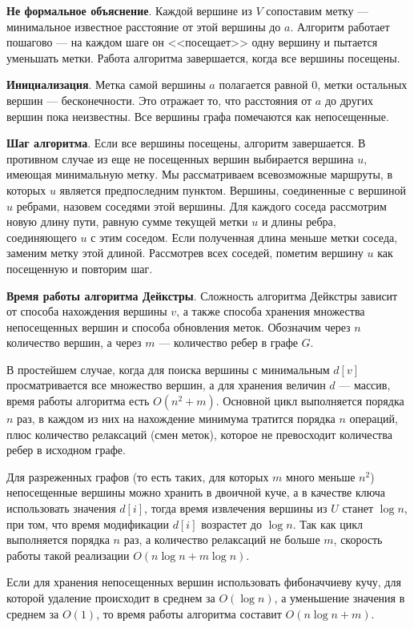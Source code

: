 \textbf{Не формальное объяснение}.
Каждой вершине из $V$ сопоставим метку --- минимальное известное расстояние от этой вершины до $a$. 
Алгоритм работает пошагово --- на каждом шаге он <<посещает>> одну вершину и пытается уменьшать метки. 
Работа алгоритма завершается, когда все вершины посещены.

\textbf{Инициализация}. 
Метка самой вершины $a$ полагается равной $0$, метки остальных вершин --- бесконечности. 
Это отражает то, что расстояния от $a$ до других вершин пока неизвестны. 
Все вершины графа помечаются как непосещенные.

\textbf{Шаг алгоритма}. 
Если все вершины посещены, алгоритм завершается. 
В противном случае из еще не посещенных вершин выбирается вершина $u$, имеющая минимальную метку. 
Мы рассматриваем всевозможные маршруты, в которых $u$ является предпоследним пунктом. 
Вершины, соединенные с вершиной $u$ ребрами, назовем соседями этой вершины. 
Для каждого соседа рассмотрим новую длину пути, равную сумме текущей метки $u$ и длины ребра, соединяющего $u$ с этим соседом. 
Если полученная длина меньше метки соседа, заменим метку этой длиной. 
Рассмотрев всех соседей, пометим вершину $u$ как посещенную и повторим шаг.

\textbf{Время работы алгоритма Дейкстры}.
Сложность алгоритма Дейкстры зависит от способа нахождения вершины $v$, а также способа хранения множества непосещенных вершин и способа обновления меток. 
Обозначим через $n$ количество вершин, а через $m$ --- количество ребер в графе $G$.

В простейшем случае, когда для поиска вершины с минимальным $d[v]$ просматривается все множество вершин, а для хранения величин $d$ --- массив, время работы алгоритма есть $O(n^2 + m)$. 
Основной цикл выполняется порядка $n$ раз, в каждом из них на нахождение минимума тратится порядка $n$ операций, плюс количество релаксаций (смен меток), которое не превосходит количества ребер в исходном графе.

Для разреженных графов (то есть таких, для которых $m$ много меньше $n^2$) непосещенные вершины можно хранить в двоичной куче, а в качестве ключа использовать значения $d[i]$, тогда время извлечения вершины из $U$ станет $\log n$, при том, что время модификации $d[i]$ возрастет до $\log n$. 
Так как цикл выполняется порядка $n$ раз, а количество релаксаций не больше $m$, скорость работы такой реализации $O(n\log n + m\log n)$.

Если для хранения непосещенных вершин использовать фибоначчиеву кучу, для которой удаление происходит в среднем за $O(\log n)$, а уменьшение значения в среднем за $O(1)$, то время работы алгоритма составит $O(n\log n + m)$.

